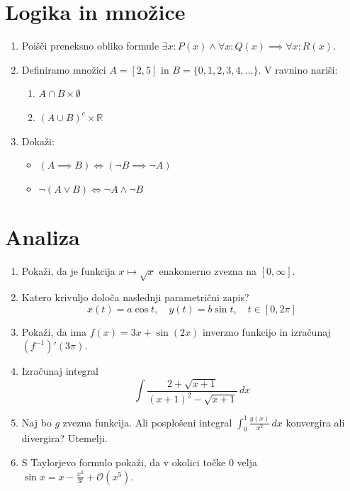 \documentclass[a4paper,12pt]{article}
\begin{document}
\section*{Logika in množice}

\begin{enumerate}
\item
Poišči preneksno obliko formule \(\exists x : P(x) \land \forall x : Q(x) \implies \forall x : R(x)\).

\item
Definiramo množici \(A = [2,5]\) in \(B = \{0, 1, 2, 3, 4, \dots\}\).
V ravnino nariši:
\begin{enumerate}
\item \(A \cap B \times \emptyset\)
\item \((A \cup B)^c \times \mathbb{R}\)
\end{enumerate}

\item
Dokaži:
\begin{itemize}
\item \((A \implies B) \iff (\neg B \implies \neg A)\)
\item \(\neg(A \lor B) \iff \neg A \land \neg B\)
\end{itemize}
\end{enumerate}

\section*{Analiza}

\begin{enumerate}
\item
Pokaži, da je funkcija \(x \mapsto \sqrt{x}\) enakomerno zvezna na \([0, \infty]\).

\item
Katero krivuljo določa naslednji parametrični zapis?
\[
x(t) = a \cos t, \quad
y(t) = b \sin t, \quad
t \in [0, 2 \pi]
\]

\item
Pokaži, da ima \(f(x) = 3x + \sin(2x)\) inverzno funkcijo in izračunaj \((f^{-1})'(3\pi)\).

\item
Izračunaj integral
\[
\displaystyle \int \frac{2+\sqrt{x+1}}{(x+1)^2-\sqrt{x+1}} \, dx
\]

\item
Naj bo \(g\) zvezna funkcija. Ali posplošeni integral
\(\int_{0}^{1} \frac{g(x)}{x^2} \, dx\)
konvergira ali divergira? Utemelji.

\item
S Taylorjevo formulo pokaži, da v okolici točke \(0\) velja
\(\sin x = x - \frac{x^3}{3!} + \mathcal{O}(x^5)\).
\end{enumerate}
\end{document}
